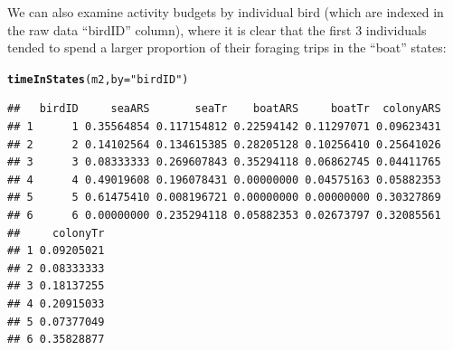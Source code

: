 \documentclass[12pt]{article}\usepackage[]{graphicx}\usepackage[]{color}
\makeatletter
\newcommand{\hlstr}[1]{\textcolor[rgb]{0.192,0.494,0.8}{#1}}%
\newcommand{\hlstd}[1]{\textcolor[rgb]{0.345,0.345,0.345}{#1}}%
\newcommand{\hlkwc}[1]{\textcolor[rgb]{0.333,0.667,0.333}{#1}}%
\newcommand{\hlkwd}[1]{\textcolor[rgb]{0.737,0.353,0.396}{\textbf{#1}}}%
\newenvironment{kframe}{%
 \def\at@end@of@kframe{}%
 \ifinner\ifhmode%
  \def\at@end@of@kframe{\end{minipage}}%
  \begin{minipage}{\columnwidth}%
 \fi\fi%
 \def\FrameCommand##1{\hskip\@totalleftmargin \hskip-\fboxsep
 \colorbox{shadecolor}{##1}\hskip-\fboxsep
     \hskip-\linewidth \hskip-\@totalleftmargin \hskip\columnwidth}%
 \MakeFramed {\advance\hsize-\width
   \@totalleftmargin\z@ \linewidth\hsize
   \@setminipage}}%
 {\par\unskip\endMakeFramed%
 \at@end@of@kframe}
\newenvironment{knitrout}{}{} %
\makeatother
\begin{document}
We can also examine activity budgets by individual bird (which are indexed in the raw data ``birdID'' column), where it is clear that the first 3 individuals tended to spend a larger proportion of their foraging trips in the ``boat'' states:
\begin{knitrout}
\color{fgcolor}\begin{kframe}
\begin{alltt}
\hlkwd{timeInStates}\hlstd{(m2,} \hlkwc{by} \hlstd{=} \hlstr{"birdID"}\hlstd{)}
\end{alltt}
\end{kframe}
\end{knitrout}
\begin{knitrout}
\color{fgcolor}\begin{kframe}
\begin{verbatim}
##   birdID     seaARS       seaTr    boatARS     boatTr  colonyARS
## 1      1 0.35564854 0.117154812 0.22594142 0.11297071 0.09623431
## 2      2 0.14102564 0.134615385 0.28205128 0.10256410 0.25641026
## 3      3 0.08333333 0.269607843 0.35294118 0.06862745 0.04411765
## 4      4 0.49019608 0.196078431 0.00000000 0.04575163 0.05882353
## 5      5 0.61475410 0.008196721 0.00000000 0.00000000 0.30327869
## 6      6 0.00000000 0.235294118 0.05882353 0.02673797 0.32085561
##     colonyTr
## 1 0.09205021
## 2 0.08333333
## 3 0.18137255
## 4 0.20915033
## 5 0.07377049
## 6 0.35828877
\end{verbatim}
\end{kframe}
\end{knitrout}
\end{document}
